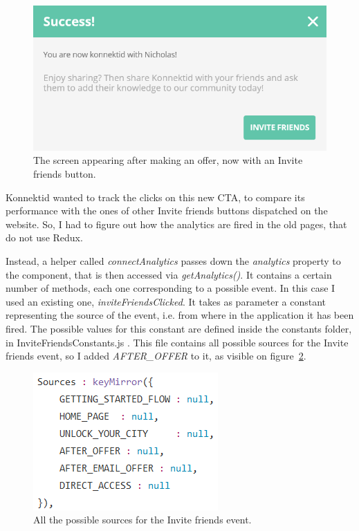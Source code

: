 \begin{figure}[H]
    \centering
    \includegraphics[scale=0.8]{figure/afterOffer.png}
    \caption{The screen appearing after making an offer, now with an \guillemotleft{} Invite friends \guillemotright{} button.}
    \label{fig:afterOffer}
\end{figure}

Konnektid wanted to track the clicks on this new CTA, to compare its performance with the ones of other \guillemotleft{} Invite friends \guillemotright{} buttons dispatched on the website. So, I had to figure out how the analytics are fired in the old pages, that do not use Redux.

Instead, a helper called \textit{connectAnalytics} passes down the \textit{analytics} property to the component, that is then accessed via \textit{getAnalytics()}. It contains a certain number of methods, each one corresponding to a possible event. In this case I used an existing one, \textit{inviteFriendsClicked}. It takes as parameter a constant representing the source of the event, i.e. from where in the application it has been fired. The possible values for this constant are defined inside the \guillemotleft{} constants \guillemotright{} folder, in \guillemotleft{} InviteFriendsConstants.js \guillemotright{}. This file contains all possible sources for the Invite friends event, so I added \textit{AFTER\_OFFER} to it, as visible on {\sc figure}~\ref{fig:inviteFriendsConstants}.

\begin{figure}[H]
    \centering
    \includegraphics{figure/inviteFriendsConstants.png}
    \caption{All the possible sources for the \guillemotleft{} Invite friends \guillemotright{} event.}
    \label{fig:inviteFriendsConstants}
\end{figure}

